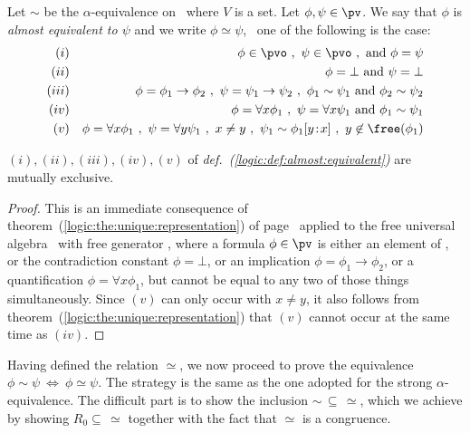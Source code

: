 \begin{defin}\label{logic:def:almost:equivalent}
Let $\sim$ be the $\alpha$-equivalence on \pv\ where $V$ is a
set. Let $\phi,\psi\in\pv$. We say that $\phi$ is {\em almost
equivalent to $\psi$} and we write $\phi\simeq\psi$, \ifand\ one of
the following is the case:
    \begin{eqnarray*}
    (i)&&\phi\in\pvo\ ,\ \psi\in\pvo\ ,\ \mbox{and}\ \phi=\psi\\
    (ii)&&\phi=\bot\ \mbox{and}\ \psi=\bot\\
    (iii)&&\phi=\phi_{1}\to\phi_{2}\ ,\ \psi=\psi_{1}\to\psi_{2}\ ,\
    \phi_{1}\sim\psi_{1}\ \mbox{and}\ \phi_{2}\sim\psi_{2}\\
    (iv)&&\phi=\forall x\phi_{1}\ ,\ \psi=\forall x\psi_{1}\ \mbox{and}\ \phi_{1}\sim\psi_{1}\\
    (v)&&\phi=\forall x\phi_{1}\ ,\ \psi=\forall y\psi_{1}\ ,\ x\neq y\ ,\
    \psi_{1}\sim \phi_{1}[y\!:\!x]\ ,\ y\not\in\free(\phi_{1})
    \end{eqnarray*}
\end{defin}


\begin{prop}
$(i),(ii),(iii),(iv), (v)$ of {\em
def.~(\ref{logic:def:almost:equivalent})} are mutually exclusive.
\end{prop}

\noindent
\begin{proof}
This is an immediate consequence of
theorem~(\ref{logic:the:unique:representation}) of
page~\pageref{logic:the:unique:representation} applied to the free
universal algebra \pv\ with free generator \pvo, where a formula
$\phi\in\pv$ is either an element of \pvo, or the contradiction
constant $\phi=\bot$, or an implication $\phi=\phi_{1}\to\phi_{2}$,
or a quantification $\phi=\forall x\phi_{1}$, but cannot be equal to
any two of those things simultaneously. Since $(v)$ can only occur
with $x\neq y$, it also follows from
theorem~(\ref{logic:the:unique:representation}) that $(v)$ cannot
occur at the same time as $(iv)$.
\end{proof}

Having defined the relation $\simeq$, we now proceed to prove the
equivalence $\phi\sim\psi\ \Leftrightarrow\ \phi\simeq\psi$. The
strategy is the same as the one adopted for the strong 
$\alpha$-equivalence. The difficult part is to show the inclusion
$\sim\,\subseteq\,\simeq$, which we achieve by showing
$R_{0}\subseteq\,\simeq$ together with the fact that $\simeq$ is a
congruence.

